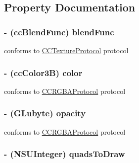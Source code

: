 \subsection{Property Documentation}
\hypertarget{interface_c_c_atlas_node_a95ccf1026e010ab1ed2577cf0e6a01cf}{
\subsubsection[{blend\-Func}]{\setlength{\rightskip}{0pt plus 5cm}-\/ ({\bf cc\-Blend\-Func}) {\bf blend\-Func}}}\label{interface_c_c_atlas_node_a95ccf1026e010ab1ed2577cf0e6a01cf}
conforms to \hyperlink{protocol_c_c_texture_protocol-p}{C\-C\-Texture\-Protocol} protocol \hypertarget{interface_c_c_atlas_node_af32feef5f87a1163f6f432bf524227e9}{
\subsubsection[{color}]{\setlength{\rightskip}{0pt plus 5cm}-\/ ({\bf cc\-Color3\-B}) {\bf color}}}\label{interface_c_c_atlas_node_af32feef5f87a1163f6f432bf524227e9}
conforms to \hyperlink{protocol_c_c_r_g_b_a_protocol-p}{C\-C\-R\-G\-B\-A\-Protocol} protocol \hypertarget{interface_c_c_atlas_node_affce9833612d523a1f3658dd40c08c1f}{
\subsubsection[{opacity}]{\setlength{\rightskip}{0pt plus 5cm}-\/ (G\-Lubyte) {\bf opacity}}}\label{interface_c_c_atlas_node_affce9833612d523a1f3658dd40c08c1f}
conforms to \hyperlink{protocol_c_c_r_g_b_a_protocol-p}{C\-C\-R\-G\-B\-A\-Protocol} protocol \hypertarget{interface_c_c_atlas_node_aef4af546b58afdaa2d75cac3ee7d60fe}{
\subsubsection[{quads\-To\-Draw}]{\setlength{\rightskip}{0pt plus 5cm}-\/ (N\-S\-U\-Integer) {\bf quads\-To\-Draw}}}\label{interface_c_c_atlas_node_aef4af546b58afdaa2d75cac3ee7d60fe}
